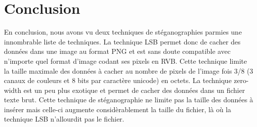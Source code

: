 \newpage
\section{Conclusion}
En conclusion, nous avons vu deux techniques de stéganographies parmies une innombrable liste de techniques.
\newline
La technique LSB permet donc de cacher des données dans une image au format PNG et est sans doute compatible avec n'importe quel format d'image codant ses pixels en RVB. Cette technique limite la taille maximale des données à cacher au nombre de pixels de l'image fois 3/8 (3 canaux de couleurs et 8 bits par caractère unicode) en octets.
\newline
La technique zero-width est un peu plus exotique et permet de cacher des données dans un fichier texte brut. Cette technique de stéganographie ne limite pas la taille des données à insérer mais celle-ci augmente considèrablement la taille du fichier, là où la technique LSB n'allourdit pas le fichier.